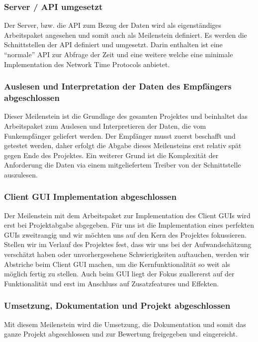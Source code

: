 \subsubsection{Server / API umgesetzt}
Der Server, bzw. die API zum Bezug der Daten wird als eigenständiges Arbeitspaket angesehen und somit auch als Meilenstein definiert. Es werden die Schnittstellen der API definiert und umgesetzt. Darin enthalten ist eine "`normale"' API zur Abfrage der Zeit und eine weitere welche eine minimale Implementation des Network Time Protocols anbietet.

\subsubsection{Auslesen und Interpretation der Daten des Empfängers abgeschlossen}
Dieser Meilenstein ist die Grundlage des gesamten Projektes und beinhaltet das Arbeitspaket zum Auslesen und Interpretieren der Daten, die vom Funkempfänger geliefert werden. Der Empfänger musst zuerst beschafft und getestet werden, daher erfolgt die Abgabe dieses Meilensteins erst relativ spät gegen Ende des Projektes. Ein weiterer Grund ist die Komplexität der Anforderung die Daten via einem mitgeliefertem Treiber von der Schnittstelle auszulesen.

\subsubsection{Client GUI Implementation abgeschlossen}
Der Meilenstein mit dem Arbeitspaket zur Implementation des Client GUIs wird erst bei Projektabgabe abgegeben. Für uns ist die Implementation eines perfekten GUIs zweitrangig und wir möchten uns auf den Kern des Projektes fokussieren. Stellen wir im Verlauf des Projektes fest, dass wir uns bei der Aufwandschätzung verschätzt haben oder unvorhergesehene Schwierigkeiten auftauchen, werden wir Abstriche beim Client GUI machen, um die Kernfunktionalität so weit als möglich fertig zu stellen. Auch beim GUI liegt der Fokus zuallererst auf der Funktionalität und erst im Anschluss auf Zusatzfeatures und Effekten.

\subsubsection{Umsetzung, Dokumentation und Projekt abgeschlossen}
Mit diesem Meilenstein wird die Umsetzung, die Dokumentation und somit das ganze Projekt abgeschlossen und zur Bewertung freigegeben und eingereicht.

